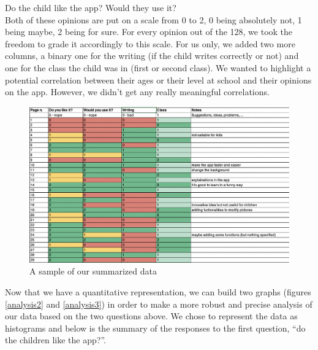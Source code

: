 \documentclass[12pt]{scrartcl}
\begin{document}
			Do the child like the app? Would they use it?\\

			Both of these opinions are put on a scale from 0 to 2, 0 being absolutely not, 1 being maybe, 2 being for sure. For every opinion out of the 128, we took the freedom to grade it accordingly to this scale. For us only, we added two more columns, a binary one for the writing (if the child writes correctly or not) and one for the class the child was in (first or second class). We wanted to highlight a potential correlation between their ages or their level at school and their opinions on the app. However, we didn't get any really meaningful correlations. 

			\begin{figure}[H]
                        		\centering
               			\includegraphics[width=\textwidth]{../images/image_1_data_analysis.png}
               			\caption{A sample of our summarized data}
                        		\label{analysis1}
      			\end{figure}

			Now that we have a quantitative representation, we can build two graphs (figures \ref{analysis2} and \ref{analysis3}) in order to make a more robust and precise analysis of our data based on the two questions above. We chose to represent the data as histograms and below is the summary of the responses to the first question, “do the children like the app?”.
\end{document}
